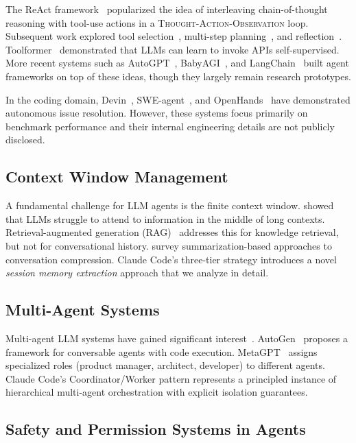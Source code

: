 \documentclass{article}
\begin{document}
The ReAct framework~\cite{yao2022react} popularized the idea of interleaving chain-of-thought reasoning with tool-use actions in a \textsc{Thought-Action-Observation} loop. Subsequent work explored tool selection~\cite{schick2023toolformer}, multi-step planning~\cite{wang2023plan}, and reflection~\cite{shinn2023reflexion}. Toolformer~\cite{schick2023toolformer} demonstrated that LLMs can learn to invoke APIs self-supervised. More recent systems such as AutoGPT~\cite{autogpt2023}, BabyAGI~\cite{nakajima2023babyagi}, and LangChain~\cite{langchain2022} built agent frameworks on top of these ideas, though they largely remain research prototypes.

In the coding domain, Devin~\cite{cognition2024devin}, SWE-agent~\cite{yang2024sweagent}, and OpenHands~\cite{wang2024openhands} have demonstrated autonomous issue resolution. However, these systems focus primarily on benchmark performance and their internal engineering details are not publicly disclosed.

\subsection{Context Window Management}

A fundamental challenge for LLM agents is the finite context window. \citet{liu2023lost} showed that LLMs struggle to attend to information in the middle of long contexts. Retrieval-augmented generation (RAG)~\cite{lewis2020retrieval} addresses this for knowledge retrieval, but not for conversational history. \citet{zhang2024survey} survey summarization-based approaches to conversation compression. Claude Code's three-tier strategy introduces a novel \emph{session memory extraction} approach that we analyze in detail.

\subsection{Multi-Agent Systems}

Multi-agent LLM systems have gained significant interest~\cite{park2023generative,wu2023autogen,hong2023metagpt}. AutoGen~\cite{wu2023autogen} proposes a framework for conversable agents with code execution. MetaGPT~\cite{hong2023metagpt} assigns specialized roles (product manager, architect, developer) to different agents. Claude Code's Coordinator/Worker pattern represents a principled instance of hierarchical multi-agent orchestration with explicit isolation guarantees.

\subsection{Safety and Permission Systems in Agents}
\end{document}

